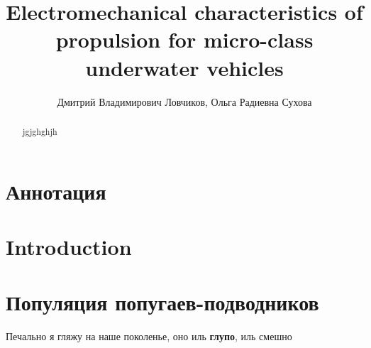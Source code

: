 \documentclass[12pt]{article}
\title{Electromechanical characteristics of propulsion for micro-class underwater vehicles}
\author{Дмитрий Владимирович Ловчиков, Ольга Радиевна Сухова}
\date{}
\begin{document}
\maketitle
\tableofcontents
\begin{abstract}
    jgjghghjh

\end{abstract}
\section*{Аннотация}
\section{Introduction}
\section{Популяция попугаев-подводников}
Печально я гляжу \textcolor[rgb]{0,150,100}{на наше поколенье}, оно иль \textbf{глупо}, иль смешно
\end{document}
